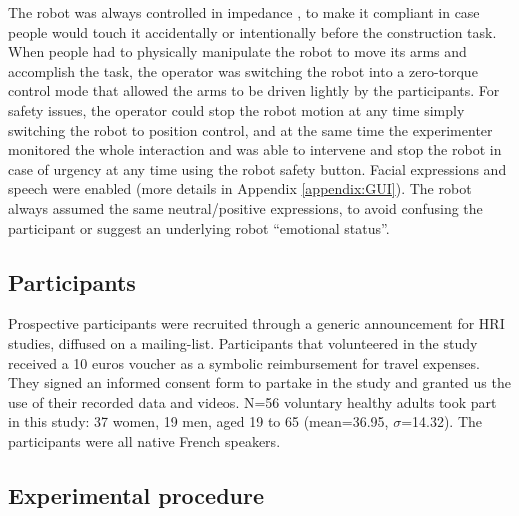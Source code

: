 The robot was always controlled in impedance \cite{idyn2012}, to make it compliant in case people would touch it accidentally or intentionally before the construction task. 
When people had to physically manipulate the robot to move its arms and accomplish the task, the operator was switching the robot into a zero-torque control mode that allowed the arms to be driven lightly by the participants. 
For safety issues, the operator could stop the robot motion at any time simply switching the robot to position control, and at the same time the experimenter monitored the whole interaction 
and was able to intervene and stop the robot in case of urgency at any time using the robot safety button. 
Facial expressions and speech were enabled (more details in Appendix \ref{appendix:GUI}).
The robot always assumed the same neutral/positive expressions, to avoid confusing the participant or suggest an underlying 
robot ``emotional status''.




\subsection{Participants} %

Prospective participants were recruited through a generic announcement for HRI studies, diffused on a mailing-list. 
Participants that volunteered in the study received a 10 euros voucher as a symbolic reimbursement for travel expenses. They signed an informed consent form to partake in the study and granted us the use of their recorded data and videos.
N=56 voluntary healthy adults took part in this study: 37 women, 19 men, aged 19 to 65 (mean=36.95, $\sigma$=14.32). The participants were all native French speakers.



\subsection{Experimental procedure}\label{section:protocol}



